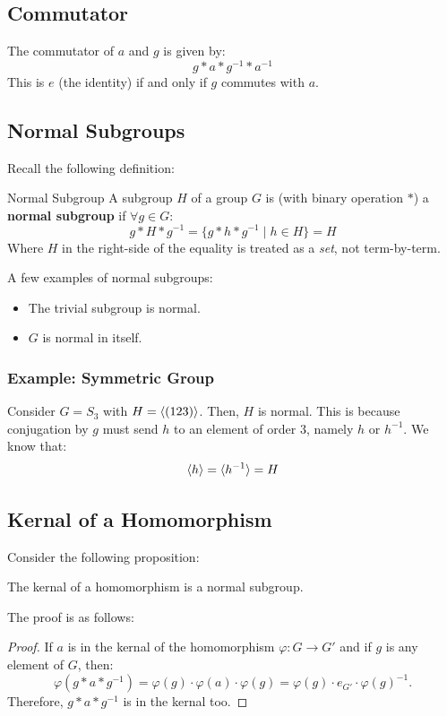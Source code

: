 \documentclass[letterpaper]{article}
\begin{document}
\subsection{Commutator}
The commutator of $a$ and $g$ is given by: 
\[g * a * g^{-1} * a^{-1}\]
This is $e$ (the identity) if and only if $g$ commutes with $a$. 

\subsection{Normal Subgroups}
Recall the following definition:
\begin{definition}{Normal Subgroup}{}
    A subgroup $H$ of a group $G$ is (with binary operation $*$) a \textbf{normal subgroup} if $\forall g \in G$:
    \[g * H * g^{-1} = \{g * h * g^{-1} \mid h \in H\} = H\]
    Where $H$ in the right-side of the equality is treated as a \emph{set}, not term-by-term. %
\end{definition}

A few examples of normal subgroups: 
\begin{itemize}
    \item The trivial subgroup is normal. 
    \item $G$ is normal in itself. 
\end{itemize}

\subsubsection{Example: Symmetric Group}
Consider $G = S_3$ with $H = \langle (123) \rangle$. Then, $H$ is normal. This is because conjugation by $g$ must send $h$ to an element of order 3, namely $h$ or $h^{-1}$. We know that: 
\[\langle h \rangle = \langle h^{-1} \rangle = H\]

\subsection{Kernal of a Homomorphism}
Consider the following proposition: 
\begin{mdframed}
    \begin{proposition}
        The kernal of a homomorphism is a normal subgroup.
    \end{proposition}
\end{mdframed}

The proof is as follows: 
\begin{mdframed}
    \begin{proof}
        If $a$ is in the kernal of the homomorphism $\varphi: G \to G'$ and if $g$ is any element of $G$, then: 
        \[\varphi(g * a * g^{-1}) = \varphi(g) \cdot \varphi(a) \cdot \varphi(g) = \varphi(g) \cdot e_{G'} \cdot \varphi(g)^{-1}.\]
        Therefore, $g * a * g^{-1}$ is in the kernal too. 
    \end{proof}
\end{mdframed}
\end{document}
